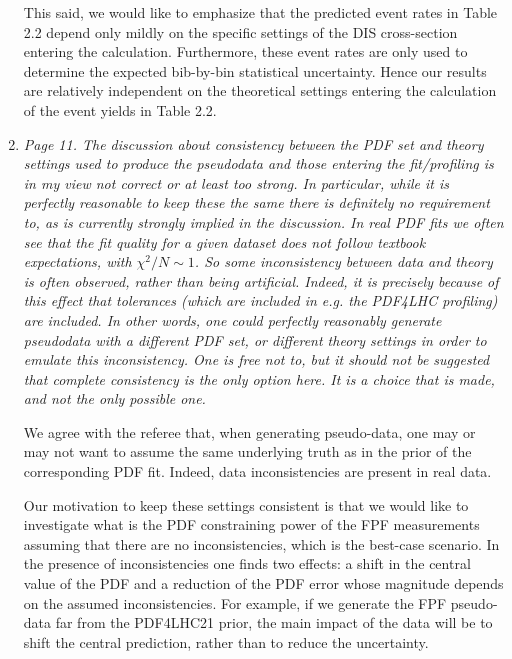 \documentclass[11pt,a4paper]{article}
\begin{document}
\begin{enumerate}
        This said, we would like to emphasize that the predicted event rates in Table 2.2 depend
        only mildly on the specific settings of the DIS cross-section entering the calculation.
        Furthermore, these event rates are only used to determine the expected bib-by-bin
        statistical uncertainty.
        Hence our results are relatively independent on the theoretical settings
        entering the calculation of the event yields in Table 2.2.
	
	\item {\it Page 11. The discussion about consistency between the PDF set and theory settings
		used to produce the pseudodata and those entering the fit/profiling is in my view not
		correct or at least too strong. In particular, while it is perfectly reasonable to keep
		these the same there is definitely no requirement to, as is currently strongly implied in
		the discussion. In real PDF fits we often see that the fit quality for a given dataset does
		not follow textbook expectations, with $\chi^2/N \sim 1$. So some inconsistency between data
		and theory is often observed, rather than being artificial. Indeed, it is precisely because
		of this effect that tolerances (which are included in e.g. the PDF4LHC profiling) are
		included. In other words, one could perfectly reasonably generate pseudodata with a
		different PDF set, or different theory settings in order to emulate this inconsistency.
		One is free not to, but it should not be suggested that complete consistency is the only
		option here. It is a choice that is made, and not the only possible one.
	}
	
          We agree with the referee that, when generating pseudo-data, one may or may not want to
          assume the same underlying truth as in the prior of the corresponding PDF fit.
          Indeed, data inconsistencies are present in real data.
          
          Our motivation to keep these settings consistent is that we would like to investigate
          what is the PDF constraining power of the FPF measurements
          assuming that there are no inconsistencies,
          which is the best-case scenario.
          In the presence of inconsistencies one finds two effects: a shift in the central value
          of the PDF and a reduction of the PDF error whose magnitude depends on the assumed
          inconsistencies.
          For example, if we generate the FPF pseudo-data far from the PDF4LHC21 prior,
          the main impact of the data will be to shift the central prediction, rather than
          to reduce the uncertainty.


\end{enumerate}
\end{document}
